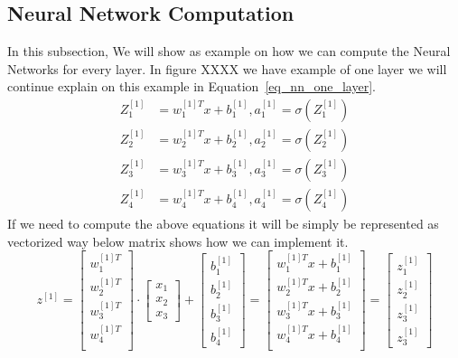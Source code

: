  \subsection{Neural Network Computation}
 In this subsection, We will show as example on how we can compute the Neural Networks for every layer. In figure XXXX we have example of one layer we will continue explain on this example in Equation~\eqref{eq_nn_one_layer}.%
 \begin{subequations}\label{eq_nn_one_layer}
   \begin{align}
     Z_1^{[1]} & = w_1^{[1]T} x + b_1^{[1]} , a_1^{[1]} = \sigma(Z_1^{[1]}) \\
     Z_2^{[1]} & = w_2^{[1]T} x + b_2^{[1]} , a_2^{[1]} = \sigma(Z_2^{[1]})\\
     Z_3^{[1]} & = w_3^{[1]T} x + b_3^{[1]} , a_3^{[1]} = \sigma(Z_3^{[1]})\\
     Z_4^{[1]} & = w_4^{[1]T} x + b_4^{[1]} , a_4^{[1]} = \sigma(Z_4^{[1]})
 \end{align}
\end{subequations}
If we need to compute the above equations it will be simply be represented as vectorized way below matrix shows how we can implement it.%
\[
z^{[1]} = 
\left[
  \begin{array}{ccc}
     w^{[1]T}_{1} \\
     w^{[1]T}_{2} \\
     w^{[1]T}_{3} \\
     w^{[1]T}_{4} \\  
  \end{array}
\right]\cdot
\left[
  \begin{array}{c}
           x_{1} \\
           x_{2} \\
    x_{3} %
  \end{array}
\right] +
\left[
  \begin{array}{c}
           b_{1}^{[1]}\\
           b_{2}^{[1]}\\
           b_{3}^{[1]}\\
           b_{4}^{[1]}
  \end{array}
\right] =
\left[
  \begin{array}{cccc}
     w^{[1]T}_{1} x + b _1^{[1]}\\
     w^{[1]T}_{2} x + b _2^{[1] }\\
     w^{[1]T}_{3} x + b _3^{[1] }\\
     w^{[1]T}_{4} x + b _4^{[1] }\\  
  \end{array}
\right] =
\left[
  \begin{array}{c}
    z_1^{[1]} \\
    z_2^{[1]} \\
    z_3^{[1]} \\
    z_3^{[1]}
  \end{array}
\right]
\]%
